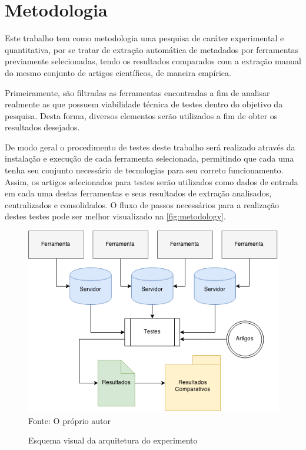 
\chapter{Metodologia}
\label{cha:methodology}

Este trabalho tem como metodologia uma pesquisa de caráter experimental e quantitativa, por se tratar de extração automática de metadados por ferramentas previamente selecionadas, tendo os resultados comparados com a extração manual do mesmo conjunto de artigos científicos, de maneira empírica.


Primeiramente, são filtradas as ferramentas encontradas a fim de analisar realmente as que possuem viabilidade técnica de testes dentro do objetivo da pesquisa. Desta forma, diversos elementos serão utilizados a fim de obter os resultados desejados.


De modo geral o procedimento de testes deste trabalho será realizado através da instalação e execução de cada ferramenta selecionada, permitindo que cada uma tenha seu conjunto necessário de tecnologias para seu correto funcionamento. Assim, os artigos selecionados para testes serão utilizados como dados de entrada em cada uma destas ferramentas e seus resultados de extração analisados, centralizados e consolidados. O fluxo de passos necessários para a realização destes testes pode ser melhor visualizado na \autoref{fig:metodology}.

\begin{figure}
    \centering
    \caption{Esquema visual da arquitetura do experimento}
    \label{fig:metodology}
    \includegraphics[width=0.8\linewidth]{./assets/images/metodology}
    \center\footnotesize{Fonte: O próprio autor}
\end{figure}


